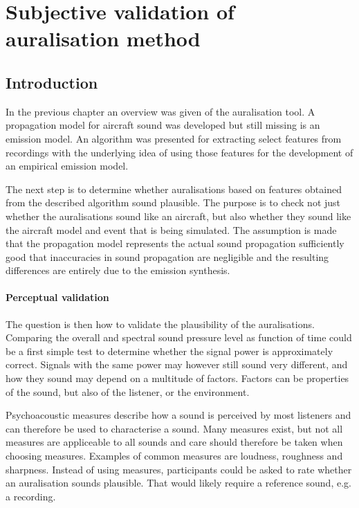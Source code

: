 \chapter{Subjective validation of auralisation method}\label{chapter:test}

\section{Introduction}
In the previous chapter an overview was given of the auralisation tool. A
propagation model for aircraft sound was developed but still missing is an
emission model. An algorithm was presented for extracting select features from
recordings with the underlying idea of using those features for the development
of an empirical emission model.

The next step is to determine whether auralisations based on features obtained
from the described algorithm sound plausible. The purpose is to check not just
whether the auralisations sound like an aircraft, but also whether they sound
like the aircraft model and event that is being simulated. The assumption is
made that the propagation model represents the actual sound propagation
sufficiently good that inaccuracies in sound propagation are negligible and the
resulting differences are entirely due to the emission synthesis.

\subsubsection*{Perceptual validation}
The question is then how to validate the plausibility of the auralisations.
Comparing the overall and spectral sound pressure level as function of time
could be a first simple test to determine whether the signal power is approximately
correct. Signals with the same power may however still sound very different,
and how they sound may depend on a multitude of factors. Factors can be properties
of the sound, but also of the listener, or the environment.

Psychoacoustic measures describe how a sound is perceived by most listeners and
can therefore be used to characterise a sound. Many measures exist, but not all
measures are appliceable to all sounds and care should therefore be taken when
choosing measures. Examples of common measures are loudness, roughness and
sharpness. Instead of using measures, participants could be asked to rate
whether an auralisation sounds plausible. That would likely require a reference
sound, e.g. a recording.

